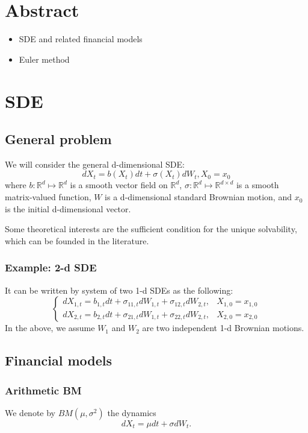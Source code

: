 \documentclass{article}
\begin{document}
\section{Abstract}
\begin{itemize}
 \item SDE and related financial models
 \item Euler method
\end{itemize}


\section{SDE}
\subsection{General problem}
We will consider the general d-dimensional SDE:
$$d X_{t} = b(X_{t}) dt + \sigma(X_{t}) dW_{t}, X_{0} = x_{0}$$
where $b: \mathbb R^{d} \mapsto \mathbb R^{d}$ is a smooth 
vector field  on  $\mathbb R^{d}$,
$\sigma: \mathbb R^{d} \mapsto \mathbb R^{d\times d}$ is a smooth 
matrix-valued function, $W$ is a d-dimensional standard Brownian motion, 
and $x_{0}$ is the initial d-dimensional vector. 


Some theoretical interests are the sufficient condition for the unique solvability, which can be founded in the literature.


\subsubsection{Example: 2-d SDE}
It can be written by system of two 1-d SDEs as the following:
$$
\left\{
\begin{array}
 {ll}
 d X_{1,t} = b_{1,t} dt + \sigma_{11,t}dW_{1,t} + \sigma_{12,t} dW_{2,t}, 
 & X_{1,0} = x_{1,0}\\
 d X_{2,t} = b_{2,t} dt + \sigma_{21,t}dW_{1,t} + \sigma_{22,t} dW_{2,t}, 
 & X_{2,0} = x_{2,0}
\end{array}
\right.
$$
In the above, we assume $W_{1}$ and $W_{2}$ are two independent 1-d Brownian motions.


\subsection{Financial models}

\subsubsection{Arithmetic BM}
We denote by $BM(\mu, \sigma^2)$ the dynamics
$$d X_t = \mu dt + \sigma dW_t.$$
\end{document}
